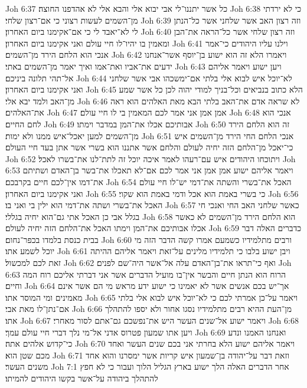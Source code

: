 Joh 6:37  כל אשר יתננו־לי אבי יבוא אלי והבא אלי לא אהדפנו החוצה׃
Joh 6:38  כי לא ירדתי מן־השמים לעשות רצוני כי אם־רצון שלחי׃
Joh 6:39  וזה רצון האב אשר שלחני אשר כל־הנתן לי לא־יאבד לי כי אם־אקימנו ביום האחרון׃
Joh 6:40  וזה רצון שלחי אשר כל־הראה את־הבן ומאמין בו יהיו־לו חיי עולם ואני אקימנו ביום האחרון׃
Joh 6:41  וילנו עליו היהודים כי־אמר אנכי הוא הלחם הירד מן־השמים׃
Joh 6:42  ויאמרו הלא זה הוא ישוע בן־יוסף אשר־אנחנו ידעים את־אביו ואת־אמו ואיך יאמר מן־השמים באתי׃
Joh 6:43  ויען ישוע ויאמר אליהם אל־תהי תלונה ביניכם׃
Joh 6:44  לא־יוכל איש לבוא אלי בלתי אם־ימשכהו אבי אשר שלחני ואני אקימנו ביום האחרון׃
Joh 6:45  הלא כתוב בנביאים וכל־בניך למודי יהוה לכן כל אשר שמע מן־האב ולמד יבא אלי׃
Joh 6:46  לא שראה אדם את־האב בלתי הבא מאת האלהים הוא ראה את־האלהים׃
Joh 6:47  אמן אמן אני אמר לכם המאמין בי לו חיי עולם׃
Joh 6:48  אנכי הוא לחם החיים׃
Joh 6:49  אבותיכם אכלו את־המן במדבר וימתו׃
Joh 6:50  זה הוא הלחם הירד מן־השמים למען יאכל־איש ממנו ולא ימות׃
Joh 6:51  אנכי הלחם החי הירד מן־השמים איש כי־יאכל מן־הלחם הזה יחיה לעולם והלחם אשר אתננו הוא בשרי אשר אתן בעד חיי העולם׃
Joh 6:52  ויתוכחו היהודים איש עם־רעהו לאמר איכה יוכל זה לתת־לנו את־בשרו לאכל׃
Joh 6:53  ויאמר אליהם ישוע אמן אמן אני אמר לכם אם־לא תאכלו את־בשר בן־האדם ושתיתם את־דמו אין־לכם חיים בקרבכם׃
Joh 6:54  האכל את־בשרי והשתה את־דמי יש־לו חיי עולם ואני אקימנו ביום האחרון׃
Joh 6:55  כי בשרי באמת הוא אכל ודמי באמת הוא שקוי׃
Joh 6:56  האכל את־בשרי ושתה את־דמי הוא ילין בי ואני בו׃
Joh 6:57  כאשר שלחני האב החי ואנכי חי בגלל אבי כן האכל אתי גם־הוא יחיה בגללי׃
Joh 6:58  הוא הלחם הירד מן־השמים לא כאשר אכלו אבותיכם את־המן וימתו האכל את־הלחם הזה יחיה לעולם׃
Joh 6:59  כדברים האלה דבר בבית כנסת בלמדו בכפר־נחום׃
Joh 6:60  ורבים מתלמידיו כשמעם אמרו קשה הדבר הזה מי יוכל לשמע אתו׃
Joh 6:61  ויבן ישוע בלבו כי תלמידיו מלינים על־זאת ויאמר אליהם ההיתה זאת לכם למכשול׃
Joh 6:62  ואף כי־תראו את־בן־האדם עלה אל־אשר היה־שם לפנים׃
Joh 6:63  הרוח הוא הנתן חיים והבשר אין־בו מועיל הדברים אשר אני דברתי אליכם רוח המה וחיים׃
Joh 6:64  אך־יש בכם אנשים אשר לא יאמינו כי ישוע ידע מראש מי הם אשר אינם מאמינים ומי המוסר אתו׃
Joh 6:65  ויאמר על־כן אמרתי לכם כי לא־יוכל איש לבוא אלי בלתי אם־נתן־לו מאת אבי׃
Joh 6:66  מן־העת ההיא רבים מתלמידיו נסגו אחור ולא יספו להתהלך אתו׃
Joh 6:67  ויאמר ישוע אל־שנים העשר היש את־נפשכם גם־אתם לסור מאחרי׃
Joh 6:68  ויען אתו שמעון פטרוס אדני אל־מי נלך דברי חיי עולם עמך׃
Joh 6:69  ואנחנו האמנו ונדע כי־קדוש אלהים אתה׃
Joh 6:70  ויאמר אליהם ישוע הלא בחרתי אני בכם שנים העשר ואחד מכם שטן הוא׃
Joh 6:71  וזאת דבר על־יהודה בן־שמעון איש קריות אשר ימסרנו והוא אחד משנים העשר׃
Joh 7:1  אחר הדברים האלה הלך ישוע בארץ הגליל הלוך ועבור כי לא חפץ להתהלך ביהודה על־אשר בקשו היהודים להמיתו׃
